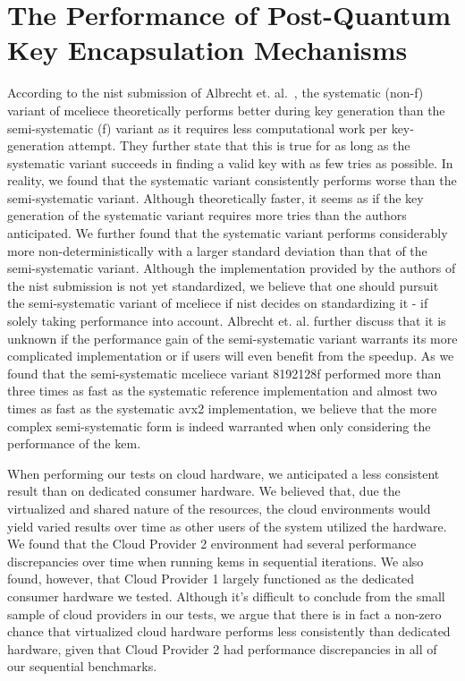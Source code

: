\section{The Performance of Post-Quantum Key Encapsulation Mechanisms}

According to the \gls{nist} submission of Albrecht et. al.~\cite{mceliece2020}, the systematic (non-f) variant of \gls{mceliece} theoretically performs better during key generation than the semi-systematic (f) variant as it requires less computational work per key-generation attempt. They further state that this is true for as long as the systematic variant succeeds in finding a valid key with as few tries as possible. In reality, we found that the systematic variant consistently performs worse than the semi-systematic variant. Although theoretically faster, it seems as if the key generation of the systematic variant requires more tries than the authors anticipated. We further found that the systematic variant performs considerably more non-deterministically with a larger standard deviation than that of the semi-systematic variant. Although the implementation provided by the authors of the \gls{nist} submission is not yet standardized, we believe that one should pursuit the semi-systematic variant of \gls{mceliece} if \gls{nist} decides on standardizing it - if solely taking performance into account. Albrecht et. al. further discuss that it is unknown if the performance gain of the semi-systematic variant warrants its more complicated implementation or if users will even benefit from the speedup. As we found that the semi-systematic \gls{mceliece} variant 8192128f performed more than three times as fast as the systematic reference implementation and almost two times as fast as the systematic \gls{avx2} implementation, we believe that the more complex semi-systematic form is indeed warranted when only considering the performance of the \gls{kem}.

When performing our tests on cloud hardware, we anticipated a less consistent result than on dedicated consumer hardware. We believed that, due the virtualized and shared nature of the resources, the cloud environments would yield varied results over time as other users of the system utilized the hardware. We found that the Cloud Provider 2 environment had several performance discrepancies over time when running \glspl{kem} in sequential iterations. We also found, however, that Cloud Provider 1 largely functioned as the dedicated consumer hardware we tested. Although it's difficult to conclude from the small sample of cloud providers in our tests, we argue that there is in fact a non-zero chance that virtualized cloud hardware performs less consistently than dedicated hardware, given that Cloud Provider 2 had performance discrepancies in all of our sequential benchmarks. 

